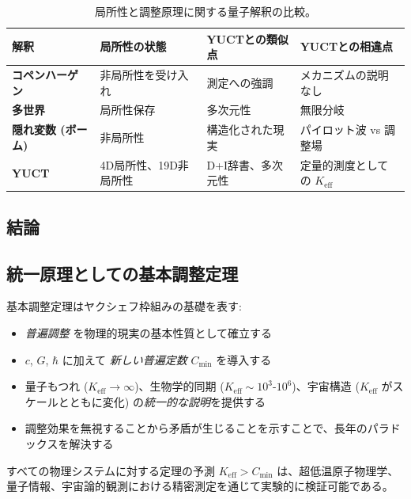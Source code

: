 \documentclass[11pt,a4paper]{article}
\begin{document}
	\begin{table}[htbp]
		\centering
	
			\begin{tabular}{p{0.22\textwidth}p{}p{}p{}}
				\toprule
				\textbf{解釈} & \textbf{局所性の状態} & \textbf{YUCTとの類似点} & \textbf{YUCTとの相違点} \\
				\midrule
				\textbf{コペンハーゲン} & 非局所性を受け入れ & 測定への強調 & メカニズムの説明なし \\
				\textbf{多世界} & 局所性保存 & 多次元性 & 無限分岐 \\
				\textbf{隠れ変数 (ボーム)} & 非局所性 & 構造化された現実 & パイロット波 vs 調整場 \\
				\textbf{YUCT} & 4D局所性、19D非局所性 & D+I辞書、多次元性 & 定量的測度としての $K_{\mathrm{eff}}$ \\
				\bottomrule
			\end{tabular}
	
		\caption{局所性と調整原理に関する量子解釈の比較。}
		\label{tab:interpretations}
	\end{table}
	
	\subsection{結論}
	\label{subsec:epr-conclusion}
	\subsection{統一原理としての基本調整定理}
	
	基本調整定理はヤクシェフ枠組みの基礎を表す:
	\begin{itemize}
		\item \emph{普遍調整} を物理的現実の基本性質として確立する
		\item $c$, $G$, $\hbar$ に加えて \emph{新しい普遍定数} $C_{\min}$ を導入する
		\item 量子もつれ ($K_{\mathrm{eff}} \to \infty$)、生物学的同期 ($K_{\mathrm{eff}} \sim 10^3$-$10^6$)、宇宙構造 ($K_{\mathrm{eff}}$ がスケールとともに変化) の\emph{統一的な説明}を提供する
		\item 調整効果を無視することから矛盾が生じることを示すことで、長年のパラドックスを解決する
	\end{itemize}
	
	すべての物理システムに対する定理の予測 $K_{\mathrm{eff}} > C_{\min}$ は、超低温原子物理学、量子情報、宇宙論的観測における精密測定を通じて実験的に検証可能である。
	
\end{document}
